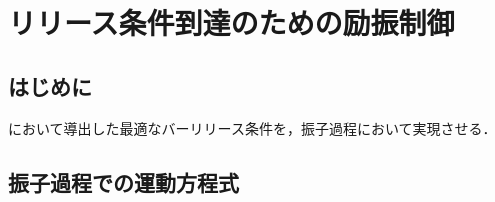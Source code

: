 \chapter[リリース条件到達のための励振制御]%
{リリース条件到達のための励振制御}
        \section{はじめに}

          において導出した最適なバーリリース条件を，振子過程において実現させる．

        \section{振子過程での運動方程式}
